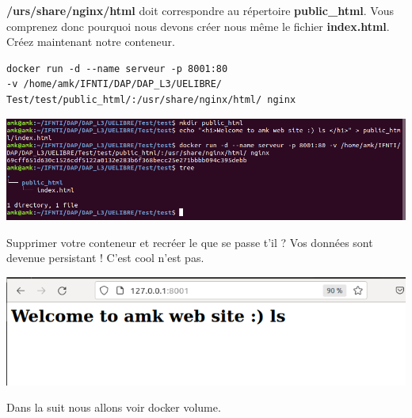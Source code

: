 \documentclass[12pt,a4paper]{article}
\begin{document}
\textbf{/urs/share/nginx/html} doit correspondre au répertoire
\textbf{public\_html}. Vous comprenez donc pourquoi nous devons 
créer nous même le fichier \textbf{index.html}. Créez maintenant
notre conteneur.
\begin{verbatim}
docker run -d --name serveur -p 8001:80 
-v /home/amk/IFNTI/DAP/DAP_L3/UELIBRE/
Test/test/public_html/:/usr/share/nginx/html/ nginx 
\end{verbatim}
\begin{center}
\includegraphics[scale=0.3]{img/volume_mount.png}
\end{center}
Supprimer votre conteneur et recréer le que se passe t'il ?
Vos données sont devenue persistant ! C'est cool n'est pas.
\begin{center}
\includegraphics[scale=0.3]{img/test_volume.png}
\end{center}
Dans la suit nous allons voir docker volume.
\end{document}

